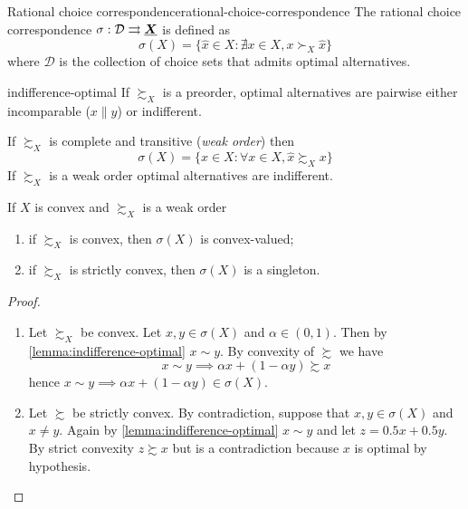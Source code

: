 \documentclass[12pt]{extarticle}
\renewcommand{\vec}[1]{\uvec{#1}}
\begin{document}
\begin{definition}{Rational choice correspondence}{rational-choice-correspondence}
	The rational choice correspondence $\sigma : \mathcal D \rightrightarrows \vec X$ is defined as
	\begin{equation}
		\sigma (X) = \{ \hat x \in X: \nexists x \in X, x \succ_X \hat x \}
	\end{equation}
	where $\mathcal D$ is the collection of choice sets that admits optimal alternatives.
\end{definition}

\begin{lemma}{}{indifference-optimal}
	If $\succsim_X$ is a preorder, optimal alternatives are pairwise either incomparable ($x \parallel y$) or indifferent.
\end{lemma}

If $\succsim_X$ is complete and transitive (\emph{weak order}) then
\begin{equation}
	\sigma(X) = \{\hat x \in X : \forall x \in X, \hat x \succsim_X x\}
\end{equation}
If $\succsim_X$ is a weak order optimal alternatives are indifferent.

\begin{proposition}{}{}
	If $X$ is convex and $\succsim_X$ is a weak order
	\begin{enumerate}[label=\roman*.]
		\item if $\succsim_X$ is convex, then $\sigma(X)$ is convex-valued;
		\item if $\succsim_X$ is strictly convex, then $\sigma(X)$ is a singleton.
	\end{enumerate}
\end{proposition}

\begin{proof}
	\skiplineafterproof
	\begin{enumerate}[label=\roman*.]
		\item Let $\succsim_X$ be convex.
		      Let $x, y \in \sigma (X)$ and $\alpha \in (0,1)$. Then by \cref{lemma:indifference-optimal} $x \sim y$.
		      By convexity of $\succsim$ we have
		      \begin{equation}
			      x \sim y \implies \alpha x + (1- \alpha y) \succsim x
		      \end{equation}
		      hence
		      $x \sim y \implies \alpha x + (1- \alpha y) \in \sigma(X)$.

		\item Let $\succsim$ be strictly convex.
		      By contradiction, suppose that $x, y \in \sigma(X)$ and $x \neq y$.
		      Again by \cref{lemma:indifference-optimal} $x \sim y$ and let $z = 0.5 x + 0.5 y$.
		      By strict convexity $z \succsim x$ but is a contradiction because $x$ is optimal by hypothesis.
	\end{enumerate}
\end{proof}
\end{document}
